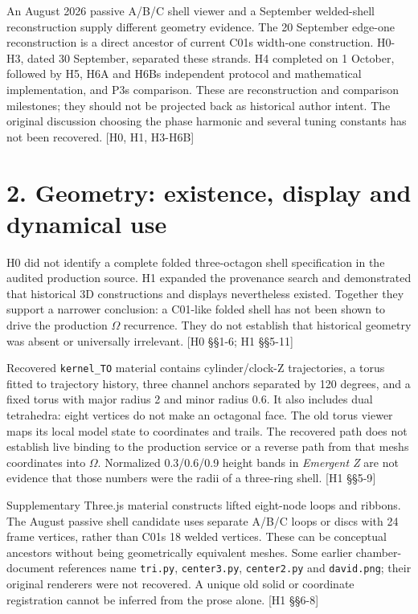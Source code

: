 \documentclass[
  11pt,
  a4paper,
]{article}
\begin{document}
An August 2026 passive A/B/C shell viewer and a September welded-shell reconstruction supply different geometry evidence. The 20 September edge-one reconstruction is a direct ancestor of current C01\textquotesingle s width-one construction. H0-H3, dated 30 September, separated these strands. H4 completed on 1 October, followed by H5, H6A and H6B\textquotesingle s independent protocol and mathematical implementation, and P3\textquotesingle s comparison. These are reconstruction and comparison milestones; they should not be projected back as historical author intent. The original discussion choosing the phase harmonic and several tuning constants has not been recovered. {[}H0, H1, H3-H6B{]}

\section{2. Geometry: existence, display and dynamical use}\label{geometry-existence-display-and-dynamical-use}

H0 did not identify a complete folded three-octagon shell specification in the audited production source. H1 expanded the provenance search and demonstrated that historical 3D constructions and displays nevertheless existed. Together they support a narrower conclusion: a C01-like folded shell has not been shown to drive the production \(\Omega\) recurrence. They do not establish that historical geometry was absent or universally irrelevant. {[}H0 §§1-6; H1 §§5-11{]}

Recovered \texttt{kernel\_TO} material contains cylinder/clock-Z trajectories, a torus fitted to trajectory history, three channel anchors separated by 120 degrees, and a fixed torus with major radius 2 and minor radius 0.6. It also includes dual tetrahedra: eight vertices do not make an octagonal face. The old torus viewer maps its local model state to coordinates and trails. The recovered path does not establish live binding to the production service or a reverse path from that mesh\textquotesingle s coordinates into \(\Omega\). Normalized 0.3/0.6/0.9 height bands in \emph{Emergent Z} are not evidence that those numbers were the radii of a three-ring shell. {[}H1 §§5-9{]}

Supplementary Three.js material constructs lifted eight-node loops and ribbons. The August passive shell candidate uses separate A/B/C loops or discs with 24 frame vertices, rather than C01\textquotesingle s 18 welded vertices. These can be conceptual ancestors without being geometrically equivalent meshes. Some earlier chamber-document references name \texttt{tri.py}, \texttt{center3.py}, \texttt{center2.py} and \texttt{david.png}; their original renderers were not recovered. A unique old solid or coordinate registration cannot be inferred from the prose alone. {[}H1 §§6-8{]}
\end{document}
